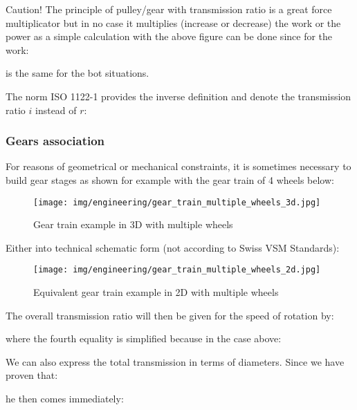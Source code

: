 	Caution! The principle of pulley/gear with transmission ratio is a great force multiplicator but in no case it multiplies (increase or decrease) the work or the power as a simple calculation with the above figure can be done since for the work:
	
	is the same for the bot situations.
	
	\begin{tcolorbox}[title=Remark,colframe=black,arc=10pt]
	The norm ISO 1122-1  provides the inverse definition and denote the transmission ratio $i$ instead of $r$:
	
	\end{tcolorbox}

	\subsubsection{Gears association}\label{gears association}
	For reasons of geometrical or mechanical constraints, it is sometimes necessary to build gear stages as shown for example with the gear train of 4 wheels below:
	\begin{figure}[H]
		\begin{center}
			\texttt{[image: img/engineering/gear\_train\_multiple\_wheels\_3d.jpg]}
		\end{center}	
		\caption{Gear train example in 3D with multiple wheels}
	\end{figure}
	Either into technical schematic form (not according to Swiss VSM Standards):
	\begin{figure}[H]
		\begin{center}
			\texttt{[image: img/engineering/gear\_train\_multiple\_wheels\_2d.jpg]}
		\end{center}	
		\caption{Equivalent gear train example in 2D with multiple wheels}
	\end{figure}
	The overall transmission ratio will then be given for the speed of rotation by:
	
	where the fourth equality is simplified because in the case above:
	
	We can also express the total transmission in terms of diameters. Since we have proven that:
	
	he then comes immediately:
	
